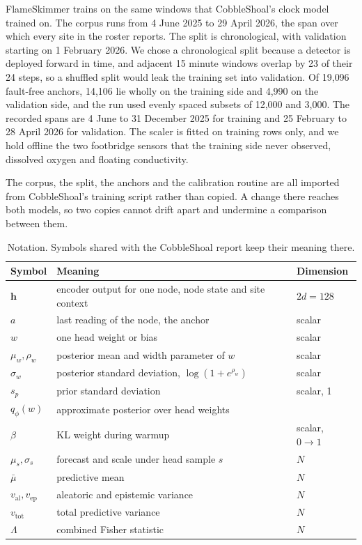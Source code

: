 \documentclass{article}
\begin{document}
FlameSkimmer trains on the same windows that CobbleShoal's clock model trained
on. The corpus runs from 4 June 2025 to 29 April 2026, the span over which
every site in the roster reports. The split is chronological, with validation
starting on 1 February 2026. We chose a chronological split because a detector
is deployed forward in time, and adjacent 15 minute windows overlap by 23 of
their 24 steps, so a shuffled split would leak the training set into
validation. Of 19{,}096 fault-free anchors, 14{,}106 lie wholly on the
training side and 4{,}990 on the validation side, and the run used evenly
spaced subsets of 12{,}000 and 3{,}000. The recorded spans are 4 June to 31
December 2025 for training and 25 February to 28 April 2026 for validation.
The scaler is fitted on training rows only, and we hold offline the two
footbridge sensors that the training side never observed, dissolved oxygen and
floating conductivity.

The corpus, the split, the anchors and the calibration routine are all imported
from CobbleShoal's training script rather than copied. A change there reaches
both models, so two copies cannot drift apart and undermine a comparison
between them.

\begin{table}[t]
  \centering
  \caption{Notation. Symbols shared with the CobbleShoal report keep their
    meaning there.}
  \label{tab:notation}
  \begin{tabular}{lll}
    \toprule
    Symbol & Meaning & Dimension \\
    \midrule
    $\bm{h}$ & encoder output for one node, node state and site context & $2d = 128$ \\
    $a$ & last reading of the node, the anchor & scalar \\
    $w$ & one head weight or bias & scalar \\
    $\mu_{w}, \rho_{w}$ & posterior mean and width parameter of $w$ & scalar \\
    $\sigma_{w}$ & posterior standard deviation, $\log(1 + e^{\rho_{w}})$ & scalar \\
    $s_{p}$ & prior standard deviation & scalar, 1 \\
    $q_{\phi}(w)$ & approximate posterior over head weights & \\
    $\beta$ & KL weight during warmup & scalar, $0 \to 1$ \\
    $\mu_{s}, \sigma_{s}$ & forecast and scale under head sample $s$ & $N$ \\
    $\bar{\mu}$ & predictive mean & $N$ \\
    $v_{\mathrm{al}}, v_{\mathrm{ep}}$ & aleatoric and epistemic variance & $N$ \\
    $v_{\mathrm{tot}}$ & total predictive variance & $N$ \\
    $\Lambda$ & combined Fisher statistic & $N$ \\
    \bottomrule
  \end{tabular}
\end{table}
\end{document}
